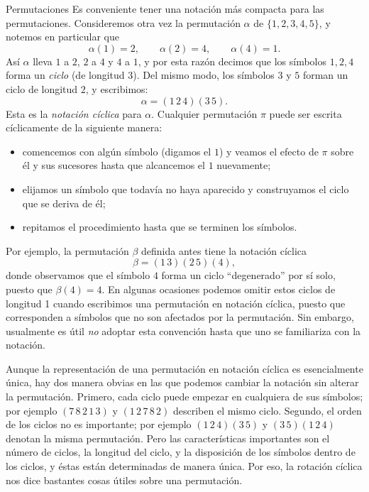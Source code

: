 \begin{section}{Permutaciones}
Es conveniente tener una notación más compacta para las permutaciones. Consideremos otra vez la permutación $\alpha$ de $\{1,2,3,4,5\}$, y notemos en particular que
$$
\alpha(1)=2,\qquad \alpha(2)=4,\qquad \alpha(4)=1.
$$
Así $\alpha$ lleva $1$ a $2$, $2$ a $4$ y $4$ a $1$, y por esta razón decimos que los símbolos $1, 2, 4$ forma un {\it ciclo } (de longitud $3$). Del mismo modo, los símbolos $3$ y $5$ forman un ciclo de longitud $2$, y
escribimos:
$$
\alpha=(1\,2\,4)(3\,5).
$$
Esta es la {\it notación cíclica} para $\alpha$. Cualquier  permutación $\pi$ puede ser escrita cíclicamente de la siguiente manera:
\begin{itemize}
\item comencemos con algún símbolo (digamos el $1$) y veamos el efecto de $\pi$ sobre él y sus sucesores hasta que alcancemos el $1$
nuevamente;
\item elijamos un símbolo que todavía no haya aparecido y construyamos el ciclo que se deriva de él; 
\item repitamos el procedimiento hasta que se terminen los símbolos.
\end{itemize}
Por ejemplo, la permutación $\beta$ definida antes tiene la notación cíclica
$$
\beta=(1\,3)(2\,5)(4),
$$
donde observamos que el símbolo $4$ forma un ciclo ``degenerado'' por sí solo, puesto que $\beta(4)=4$. En algunas ocasiones podemos omitir estos ciclos de longitud 1 cuando escribimos una permutación en notación cíclica, puesto que corresponden a símbolos que no son afectados por la permutación. Sin embargo, usualmente es útil {\it no} adoptar esta convención hasta que uno se familiariza con la notación.


Aunque la representación de una permutación en notación cíclica es esencialmente única, hay dos manera obvias en las que podemos cambiar la notación sin alterar la permutación. Primero, cada ciclo puede empezar en cualquiera de sus símbolos; por ejemplo $(7\,8\,2\,1\,3)$ y $(1\,2\,7\,8\,2)$ describen el mismo ciclo. Segundo, el orden de los ciclos no es importante; por ejemplo $(1\,2\,4) (3\,5)$ y $(3\,5) (1\,2\,4)$ denotan la misma permutación. Pero las características importantes son el número de ciclos, la longitud del ciclo, y la disposición de los símbolos dentro de los ciclos, y éstas están determinadas de manera única. Por eso, la rotación cíclica nos dice bastantes cosas útiles sobre una permutación.


\end{section}
